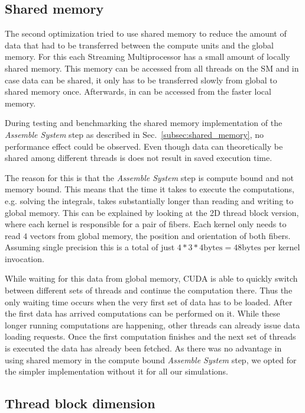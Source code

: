 \subsection{Shared memory}
\label{subsec:bench_shared_memory}

The second optimization tried to use shared memory to reduce the amount of data that had to be transferred between the compute units and the global memory. For this each Streaming Multiprocessor has a small amount of locally shared memory. This memory can be accessed from all threads on the SM and in case data can be shared, it only has to be transferred slowly from global to shared memory once. Afterwards, in can be accessed from the faster local memory.

During testing and benchmarking the shared memory implementation of the \emph{Assemble System} step as described in Sec.~\ref{subsec:shared_memory}, no performance effect could be observed. Even though data can theoretically be shared among different threads is does not result in saved execution time.

The reason for this is that the \emph{Assemble System} step is compute bound and not memory bound. This means that the time it takes to execute the computations, e.g. solving the integrals, takes substantially longer than reading and writing to global memory. This can be explained by looking at the 2D thread block version, where each kernel is responsible for a pair of fibers. Each kernel only needs to read $4$ vectors from global memory, the position and orientation of both fibers. Assuming single precision this is a total of just $4 * 3 * 4\text{bytes} = 48\text{bytes}$ per kernel invocation.

While waiting for this data from global memory, CUDA is able to quickly switch between different sets of threads and continue the computation there. Thus the only waiting time occurs when the very first set of data has to be loaded. After the first data has arrived computations can be performed on it. While these longer running computations are happening, other threads can already issue data loading requests. Once the first computation finishes and the next set of threads is executed the data has already been fetched. As there was no advantage in using shared memory in the compute bound \emph{Assemble System} step, we opted for the simpler implementation without it for all our simulations.

\subsection{Thread block dimension}

